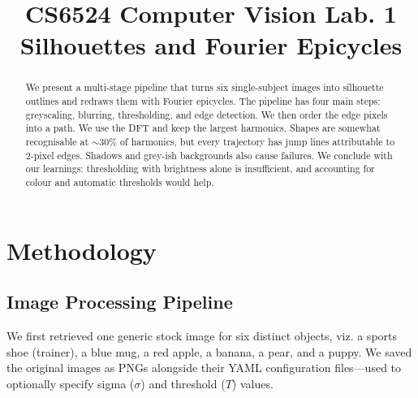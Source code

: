 \documentclass[conference]{IEEEtran}
\begin{document}
\title{CS6524 Computer Vision Lab. 1\\ Silhouettes and Fourier Epicycles}

\author{
  \and
  \and
  \and
}

\maketitle

\begin{abstract}
  We present a multi-stage pipeline that turns six single-subject images into silhouette outlines and redraws them with Fourier epicycles.
  The pipeline has four main steps: greyscaling, blurring, thresholding, and edge detection.
  We then order the edge pixels into a path.
  We use the DFT and keep the largest harmonics.
  Shapes are somewhat recognisable at $\sim$30\% of harmonics, but every trajectory has jump lines attributable to 2-pixel edges.
  Shadows and grey-ish backgrounds also cause failures.
  We conclude with our learnings: thresholding with brightness alone is insufficient, and accounting for colour and automatic thresholds would help.
\end{abstract}

\section{Methodology}

\subsection{Image Processing Pipeline}
\label{sec:pipeline}
We first retrieved one generic stock image for six distinct objects, viz. a sports shoe (trainer), a blue mug, a red apple, a banana, a pear, and a puppy.
We saved the original images as PNGs alongside their YAML configuration files—used to optionally specify sigma ($\sigma$) and threshold ($T$) values.
\end{document}
